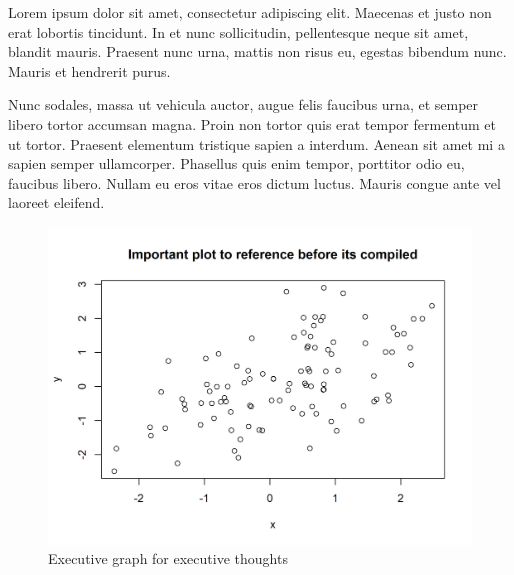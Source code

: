 \documentclass[]{elsarticle} %
\begin{document}
Lorem ipsum dolor sit amet, consectetur adipiscing elit. Maecenas et
justo non erat lobortis tincidunt. In et nunc sollicitudin, pellentesque
neque sit amet, blandit mauris. Praesent nunc urna, mattis non risus eu,
egestas bibendum nunc. Mauris et hendrerit purus.

Nunc sodales, massa ut vehicula auctor, augue felis faucibus urna, et
semper libero tortor accumsan magna. Proin non tortor quis erat tempor
fermentum et ut tortor. Praesent elementum tristique sapien a interdum.
Aenean sit amet mi a sapien semper ullamcorper. Phasellus quis enim
tempor, porttitor odio eu, faucibus libero. Nullam eu eros vitae eros
dictum luctus. Mauris congue ante vel laoreet eleifend.

\begin{figure}[H]

{\centering \includegraphics[width=0.9\linewidth]{cookbook_files/figure-latex/chunk-a-1} 

}

\caption{Executive graph for executive thoughts}\label{fig:chunk-a}
\end{figure}
\end{document}
